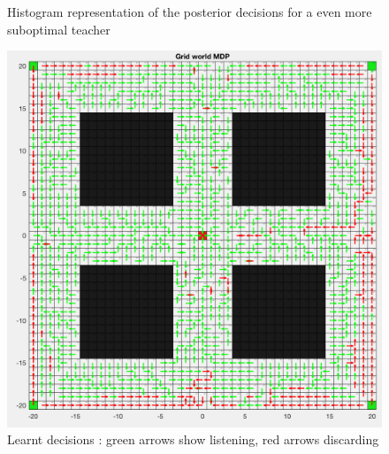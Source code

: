 \documentclass[a4paper]{report}
\begin{document}
{{{{\begin{figure}[ht!]
\begin{minipage}{0.45\linewidth}
\begin{center}
							\caption{Histogram representation of the posterior decisions for a even more suboptimal teacher}
							\label{fig::post_des_50}
						\end{center}
					\end{minipage}
				\end{figure}
				
				
				\begin{figure}[ht!]
					\begin{minipage}{0.5\linewidth}
						\begin{center}
							\includegraphics[width=0.9\linewidth]{heatmap_decision_120}
							\caption{Learnt decisions : green arrows show listening, red arrows discarding}
							\label{fig::heatmap_des_120}
						\end{center}
					\end{minipage}
					\hfill
					\begin{minipage}{0.5\linewidth}
						\begin{center}

\end{center}
\end{minipage}
\end{figure}}}}}
\end{document}
